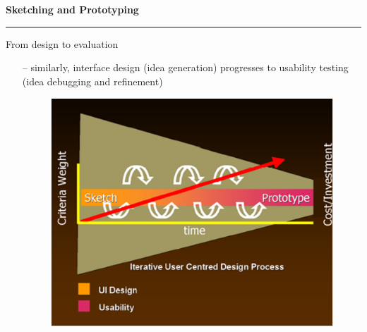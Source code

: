 \documentclass[pdf]{beamer}
\begin{document}
\begin{frame}
\vspace{8mm}
\textcolor{myBlue}{\textbf{\Large{Sketching and Prototyping}}}

\textcolor{red}{\rule{10cm}{1mm}}

\bigskip

{\LARGE From design to evaluation \LARGE}

\begin{itemize}
    \item[\textcolor{black}{--}] similarly, interface design (idea generation) progresses to usability testing (idea debugging and refinement)

\begin{figure}[b]
    	\includegraphics[scale = 0.5]{11.PNG}
\end{figure}
\end{itemize}
\end{frame}
\end{document}
